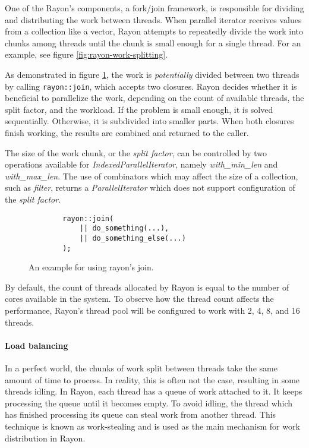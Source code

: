 One of the Rayon's components, a fork/join framework, is responsible for dividing and distributing the work between threads. When parallel iterator receives values from a collection like a vector, Rayon attempts to repeatedly divide the work into chunks among threads until the chunk is small enough for a single thread. For an example, see figure \ref{fig:rayon-work-splitting}.

As demonstrated in figure \ref{fig:rayon-join}, the work is \emph{potentially} divided between two threads by calling \texttt{rayon::join}, which accepts two closures. Rayon decides whether it is beneficial to parallelize the work, depending on the count of available threads, the split factor, and the workload. If the problem is small enough, it is solved sequentially. Otherwise, it is subdivided into smaller parts. When both closures finish working, the results are combined and returned to the caller.

The size of the work chunk, or the \emph{split factor}, can be controlled by two operations available for \emph{IndexedParallelIterator}, namely \emph{with\_min\_len} and \emph{with\_max\_len}. The use of combinators which may affect the size of a collection, such as \emph{filter}, returns a \emph{ParallelIterator} which does not support configuration of the \emph{split factor}.

\begin{figure}[!htbp]
    \centering

    \begin{verbatim}
        rayon::join(
            || do_something(...),
            || do_something_else(...)
        );
    \end{verbatim}

    \caption{An example for using rayon's join.}
    \label{fig:rayon-join}
\end{figure}

By default, the count of threads allocated by Rayon is equal to the number of cores available in the system. To observe how the thread count affects the performance, Rayon's thread pool will be configured to work with 2, 4, 8, and 16 threads.

\paragraph*{Load balancing}
In a perfect world, the chunks of work split between threads take the same amount of time to process. In reality, this is often not the case, resulting in some threads idling. In Rayon, each thread has a queue of work attached to it. It keeps processing the queue until it becomes empty. To avoid idling, the thread which has finished processing its queue can steal work from another thread. This technique is known as work-stealing and is used as the main mechanism for work distribution in Rayon.

